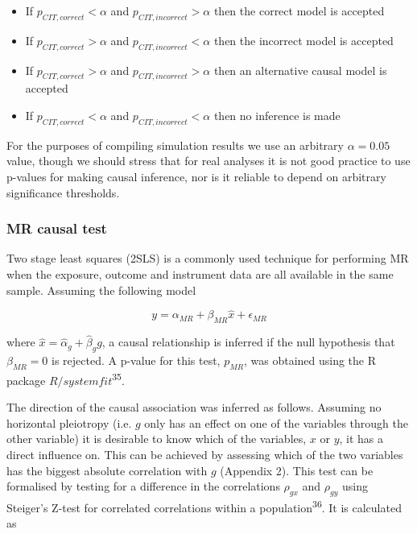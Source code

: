 \documentclass[]{article}
\providecommand{\tightlist}{%
  \setlength{\itemsep}{0pt}\setlength{\parskip}{0pt}}
\begin{document}
\begin{itemize}
\tightlist
\item
  If \(p_{CIT,correct} < \alpha\) and \(p_{CIT,incorrect} > \alpha\)
  then the correct model is accepted
\item
  If \(p_{CIT,correct} > \alpha\) and \(p_{CIT,incorrect} < \alpha\)
  then the incorrect model is accepted
\item
  If \(p_{CIT,correct} > \alpha\) and \(p_{CIT,incorrect} > \alpha\)
  then an alternative causal model is accepted
\item
  If \(p_{CIT,correct} < \alpha\) and \(p_{CIT,incorrect} < \alpha\)
  then no inference is made
\end{itemize}

For the purposes of compiling simulation results we use an arbitrary
\(\alpha = 0.05\) value, though we should stress that for real analyses
it is not good practice to use p-values for making causal inference, nor
is it reliable to depend on arbitrary significance thresholds.

\subsubsection{MR causal test}\label{mr-causal-test}

Two stage least squares (2SLS) is a commonly used technique for
performing MR when the exposure, outcome and instrument data are all
available in the same sample. Assuming the following model

\[
y = \alpha_{MR} + \beta_{MR} \hat{x} + \epsilon_{MR}
\]

where \(\hat{x} = \hat{\alpha}_g + \hat{\beta}_g g\), a causal
relationship is inferred if the null hypothesis that \(\beta_{MR} = 0\)
is rejected. A p-value for this test, \(p_{MR}\), was obtained using the
R package \(R/systemfit\)\textsuperscript{35}.

The direction of the causal association was inferred as follows.
Assuming no horizontal pleiotropy (i.e. \(g\) only has an effect on one
of the variables through the other variable) it is desirable to know
which of the variables, \(x\) or \(y\), it has a direct influence on.
This can be achieved by assessing which of the two variables has the
biggest absolute correlation with \(g\) (Appendix 2). This test can be
formalised by testing for a difference in the correlations \(\rho_{gx}\)
and \(\rho_{gy}\) using Steiger's Z-test for correlated correlations
within a population\textsuperscript{36}. It is calculated as
\end{document}
